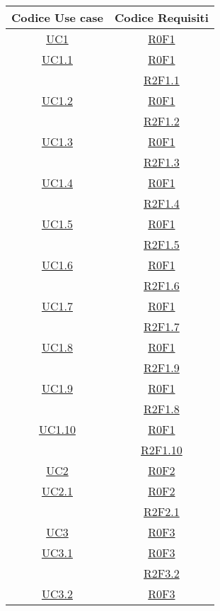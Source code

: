 \clearpage
\normalsize
\begin{longtable}{|c|c|}
\hline
\textbf{Codice Use case} & \textbf{Codice Requisiti} \\
\hline
\endhead
\hyperlink{UC1}{UC1} & \hyperlink{R0F1}{R0F1}\\
\hline
\hyperlink{UC1.1}{UC1.1} & \hyperlink{R0F1}{R0F1}\\
& \hyperlink{R2F1.1}{R2F1.1}\\
\hline
\hyperlink{UC1.2}{UC1.2} & \hyperlink{R0F1}{R0F1}\\
& \hyperlink{R2F1.2}{R2F1.2}\\
\hline
\hyperlink{UC1.3}{UC1.3} & \hyperlink{R0F1}{R0F1}\\
& \hyperlink{R2F1.3}{R2F1.3}\\
\hline
\hyperlink{UC1.4}{UC1.4} & \hyperlink{R0F1}{R0F1}\\
& \hyperlink{R2F1.4}{R2F1.4}\\
\hline
\hyperlink{UC1.5}{UC1.5} & \hyperlink{R0F1}{R0F1}\\
& \hyperlink{R2F1.5}{R2F1.5}\\
\hline
\hyperlink{UC1.6}{UC1.6} & \hyperlink{R0F1}{R0F1}\\
& \hyperlink{R2F1.6}{R2F1.6}\\
\hline
\hyperlink{UC1.7}{UC1.7} & \hyperlink{R0F1}{R0F1}\\
& \hyperlink{R2F1.7}{R2F1.7}\\
\hline
\hyperlink{UC1.8}{UC1.8} & \hyperlink{R0F1}{R0F1}\\
& \hyperlink{R2F1.9}{R2F1.9}\\
\hline
\hyperlink{UC1.9}{UC1.9} & \hyperlink{R0F1}{R0F1}\\
& \hyperlink{R2F1.8}{R2F1.8}\\
\hline
\hyperlink{UC1.10}{UC1.10} & \hyperlink{R0F1}{R0F1}\\
& \hyperlink{R2F1.10}{R2F1.10}\\
\hline
\hyperlink{UC2}{UC2} & \hyperlink{R0F2}{R0F2}\\
\hline
\hyperlink{UC2.1}{UC2.1} & \hyperlink{R0F2}{R0F2}\\
& \hyperlink{R2F2.1}{R2F2.1}\\
\hline
\hyperlink{UC3}{UC3} & \hyperlink{R0F3}{R0F3}\\
\hline
\hyperlink{UC3.1}{UC3.1} & \hyperlink{R0F3}{R0F3}\\
& \hyperlink{R2F3.2}{R2F3.2}\\
\hline
\hyperlink{UC3.2}{UC3.2} & \hyperlink{R0F3}{R0F3}\\

\end{longtable}
